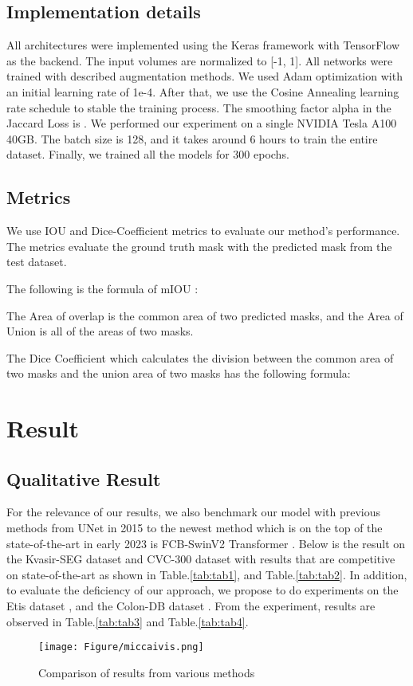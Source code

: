 \documentclass[conference]{IEEEtran}
\begin{document}
\subsection{Implementation details}

All architectures were implemented using the Keras framework with TensorFlow as the backend. The input volumes are normalized to [-1, 1]. All networks were trained with described augmentation methods. We used Adam optimization \cite{kingma2014adam} with an initial learning rate of 1e-4. After that, we use the Cosine Annealing learning rate schedule to stable the training process. The smoothing factor alpha  in the Jaccard Loss is . We performed
our experiment on a single NVIDIA Tesla A100 40GB. The batch size is 128, and it takes around 6 hours to train the entire dataset. Finally, we trained all the models for 300 epochs.

\subsection{Metrics}


We use IOU and Dice-Coefficient metrics to evaluate our method's performance. The metrics evaluate the ground truth mask with the predicted mask from the test dataset.

The following is the formula of mIOU \cite{iou}:


The Area of overlap is the common area of two predicted masks, and the Area of Union is all of the areas of two masks.

The Dice Coefficient \cite{dicecoef} which calculates the division between the common area of two masks and the union area of two masks has the following formula:


\section{Result}


\subsection{Qualitative Result}

For the relevance of our results, we also benchmark our model with previous methods from UNet \cite{unet} in 2015 to the newest method which is on the top of the state-of-the-art in early 2023 is FCB-SwinV2 Transformer \cite{fcb}. Below is the result on the Kvasir-SEG dataset\cite{jha2020medico} and CVC-300 dataset \cite{cvc300} with results that are competitive on state-of-the-art as shown in Table.\ref{tab:tab1}, and Table.\ref{tab:tab2}. In addition, to evaluate the deficiency of our approach, we propose to do experiments on the Etis dataset \cite{etis}, and the Colon-DB dataset \cite{colondb}. From the experiment, results are observed in Table.\ref{tab:tab3} and Table.\ref{tab:tab4}.
\begin{figure*}[ht]
    \centering
    \texttt{[image: Figure/miccaivis.png]}
    \caption{Comparison of results from various methods}
    \label{fig:vis}
\end{figure*}
\end{document}
